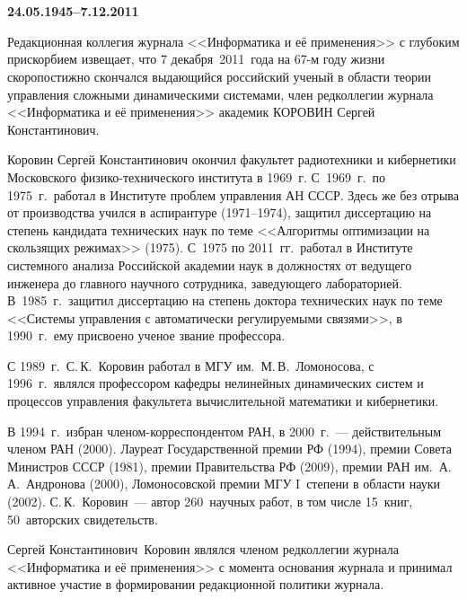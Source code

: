    \vspace*{-36pt}

\begin{center}
\vspace*{6pt}
\mbox{%
\epsfxsize=79.5mm
}
\end{center} 

\vspace*{12pt} %


   \begin{center}
\\[12pt]
\textbf{\large 24.05.1945--7.12.2011}
   \end{center}
   
   
   \vspace*{5mm}
   
   \thispagestyle{empty}




Редакционная коллегия журнала <<Информатика и её применения>> с глубоким 
прискорбием извещает, что 7 декабря~2011~года на 67-м году жизни скоропостижно 
скончался выдающийся российский ученый в области теории управления сложными 
динамическими системами, член редколлегии журнала <<Информатика и её применения>> 
академик КОРОВИН Сергей Константинович.

Коровин Сергей Константинович окончил факультет радиотехники и 
кибернетики Московского физико-технического института в 1969~г. 
С~1969~г.\ по 1975~г.\ работал в Институте проблем управления АН СССР. 
Здесь же без отрыва от производства учился в аспирантуре (1971--1974), 
защитил диссертацию на степень кандидата технических наук по теме 
<<Алгоритмы оптимизации на скользящих режимах>> (1975). С~1975 по 2011~гг.\ 
работал в Институте системного анализа Российской академии наук 
в должностях от ведущего инженера 
до главного научного сотрудника, заведующего лабораторией. В~1985~г.\ защитил 
диссертацию на степень доктора технических наук по теме <<Системы управления 
с автоматически регулируемыми связями>>, в 1990~г.\ ему присвоено ученое звание профессора.

С 1989~г.\ С.\,К.~Коровин работал в МГУ им.\ М.\,В.~Ломоносова, с 1996~г.\ 
являлся профессором кафедры нелинейных динамических систем и процессов 
управ\-ле\-ния факультета вычислительной математики и кибернетики. 

В 1994~г.\ избран членом-кор\-рес\-пон\-ден\-том РАН, в 2000~г.~--- действительным членом 
РАН (2000). Лауреат Государственной премии РФ (1994), премии Совета Министров СССР (1981), 
премии Правительства РФ (2009), премии РАН им.\ А.\,А.~Андронова (2000), Ломоносовской 
премии МГУ I~степени в области науки (2002). С.\,К.~Коровин~--- автор 260~научных работ, в том 
чис\-ле 15~книг, 50~авторских свидетельств. 

Сергей Константинович~Коровин являлся членом редколлегии журнала <<Информатика и её применения>> с 
момента основания журнала и принимал активное участие в формировании редакционной 
политики журнала. 